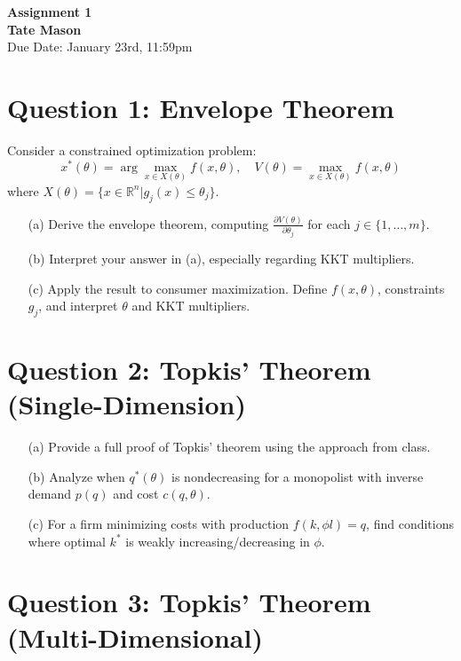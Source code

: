 \documentclass[10pt, a4paper]{article}
\newcommand{\hwnumber}{1}
\newcommand{\Information}{Tate Mason}
\begin{document}
\begin{center}
    \Large \textbf{Assignment \hwnumber} \\
    \Large \textbf{\Information} \\
    \normalsize Due Date: January 23rd, 11:59pm \\
\end{center}

\section*{Question 1: Envelope Theorem}

Consider a constrained optimization problem:
\[
x^*(\theta) = \arg \max_{x \in X(\theta)} f(x, \theta), \quad V(\theta) = \max_{x \in X(\theta)} f(x, \theta)
\]
where $X(\theta) = \{x \in \mathbb{R}^n | g_j(x) \leq \theta_j\}$.

\begin{enumerate}
    \item[(a)] Derive the envelope theorem, computing $\frac{\partial V(\theta)}{\partial \theta_j}$ for each $j \in \{1, \ldots, m\}$.
    \item[(b)] Interpret your answer in (a), especially regarding KKT multipliers.
    \item[(c)] Apply the result to consumer maximization. Define $f(x, \theta)$, constraints $g_j$, and interpret $\theta$ and KKT multipliers.
\end{enumerate}


\section*{Question 2: Topkis' Theorem (Single-Dimension)}

\begin{enumerate}
    \item[(a)] Provide a full proof of Topkis' theorem using the approach from class.
    \item[(b)] Analyze when $q^*(\theta)$ is nondecreasing for a monopolist with inverse demand $p(q)$ and cost $c(q, \theta)$.
    \item[(c)] For a firm minimizing costs with production $f(k, \phi l) = q$, find conditions where optimal $k^*$ is weakly increasing/decreasing in $\phi$.
\end{enumerate}

\section*{Question 3: Topkis' Theorem (Multi-Dimensional)}
\end{document}
